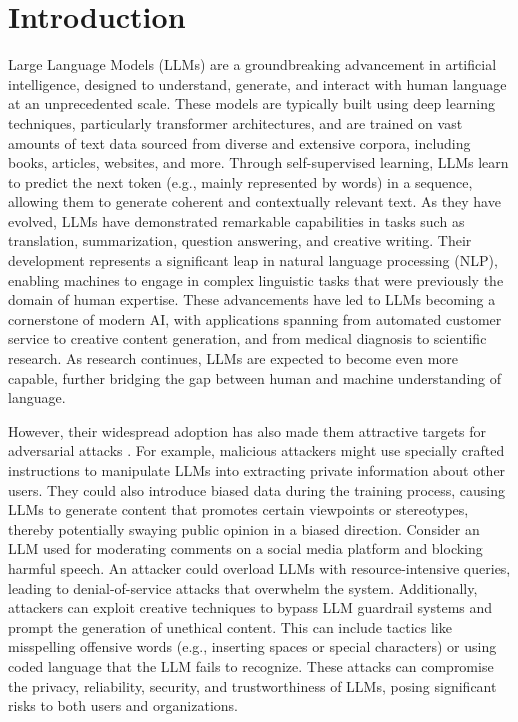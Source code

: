 \section{Introduction}

Large Language Models (LLMs) are a groundbreaking advancement in artificial intelligence, designed to understand, generate, and interact with human language at an unprecedented scale. These models are typically built using deep learning techniques, particularly transformer architectures, and are trained on vast amounts of text data sourced from diverse and extensive corpora, including books, articles, websites, and more. Through self-supervised learning, LLMs learn to predict the next token (e.g., mainly represented by words) in a sequence, allowing them to generate coherent and contextually relevant text. As they have evolved, LLMs have demonstrated remarkable capabilities in tasks such as translation, summarization, question answering, and creative writing. Their development represents a significant leap in natural language processing (NLP), enabling machines to engage in complex linguistic tasks that were previously the domain of human expertise. These advancements have led to LLMs becoming a cornerstone of modern AI, with applications spanning from automated customer service to creative content generation, and from medical diagnosis to scientific research. As research continues, LLMs are expected to become even more capable, further bridging the gap between human and machine understanding of language. 

However, their widespread adoption has also made them attractive targets for adversarial attacks \cite{mireshghallah_2022a, mireshghallah_2022b, mattern_2023a, fu_2023a, guo2021adversarialattacks, maus2023adversarialprompting, shumailov2021sponge, lintelo2024skipsponge, xue2024badrag, greshake_2023a, wei_2023b, deng_2024a, yong_2024a, yuan_2023a}. For example, malicious attackers might use specially crafted instructions to manipulate LLMs into extracting private information about other users. They could also introduce biased data during the training process, causing LLMs to generate content that promotes certain viewpoints or stereotypes, thereby potentially swaying public opinion in a biased direction. Consider an LLM used for moderating comments on a social media platform and blocking harmful speech. An attacker could overload LLMs with resource-intensive queries, leading to denial-of-service attacks that overwhelm the system. Additionally, attackers can exploit creative techniques to bypass LLM guardrail systems and prompt the generation of unethical content. This can include tactics like misspelling offensive words (e.g., inserting spaces or special characters) or using coded language that the LLM fails to recognize. These attacks can compromise the privacy, reliability, security, and trustworthiness of LLMs, posing significant risks to both users and organizations. 

